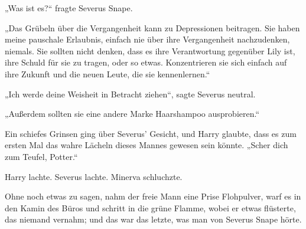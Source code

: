„Was ist es?“ fragte Severus Snape.

„Das Grübeln über die Vergangenheit kann zu Depressionen beitragen. Sie haben meine pauschale Erlaubnis, einfach nie über ihre Vergangenheit nachzudenken, niemals. Sie sollten nicht denken, dass es ihre Verantwortung gegenüber Lily ist, ihre Schuld für sie zu tragen, oder so etwas. Konzentrieren sie sich einfach auf ihre Zukunft und die neuen Leute, die sie kennenlernen.“

„Ich werde deine Weisheit in Betracht ziehen“, sagte Severus neutral.

„Außerdem sollten sie eine andere Marke Haarshampoo ausprobieren.“

Ein schiefes Grinsen ging über Severus’ Gesicht, und Harry glaubte, dass es zum ersten Mal das wahre Lächeln dieses Mannes gewesen sein könnte.
„Scher dich zum Teufel, Potter.“

Harry lachte. Severus lachte. Minerva schluchzte.

Ohne noch etwas zu sagen, nahm der freie Mann eine Prise Flohpulver, warf es in den Kamin des Büros und schritt in die grüne Flamme, wobei er etwas flüsterte, das niemand vernahm; und das war das letzte, was man von Severus Snape hörte.
